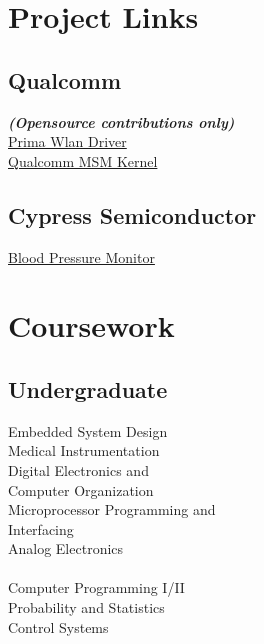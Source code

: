 \documentclass[letterpaper]{deedy-resume} %
\begin{document}
\begin{minipage}[t]{0.33\textwidth}
\sectionspace %


\section{Project Links}
\subsection{Qualcomm}
\footnotesize \textit{\textbf{(Opensource contributions only)} } \\
\href{https://www.codeaurora.org/cgit/quic/la/platform/vendor/qcom-opensource/wlan/prima/}{Prima Wlan Driver} \\
\href{https://www.codeaurora.org/cgit/quic/la/kernel/msm-3.10}{Qualcomm MSM Kernel} \\
\subsection{Cypress Semiconductor}
\href{https://github.com/smihir/PSoC-BP-Monitor}{Blood Pressure Monitor} \\

\sectionspace %


\section{Coursework}

\subsection{Undergraduate}

\textbullet{} Embedded System Design \\
\textbullet{} Medical Instrumentation \\
\textbullet{} Digital Electronics and \\ \hphantom{\textbullet{}}Computer Organization \\
\textbullet{} Microprocessor Programming and \\ \hphantom{\textbullet{}}Interfacing \\
\textbullet{} Analog Electronics \\
 \\
\textbullet{} Computer Programming I/II \\
\textbullet{} Probability and Statistics \\
\textbullet{} Control Systems \\


\end{minipage}
\end{document}
